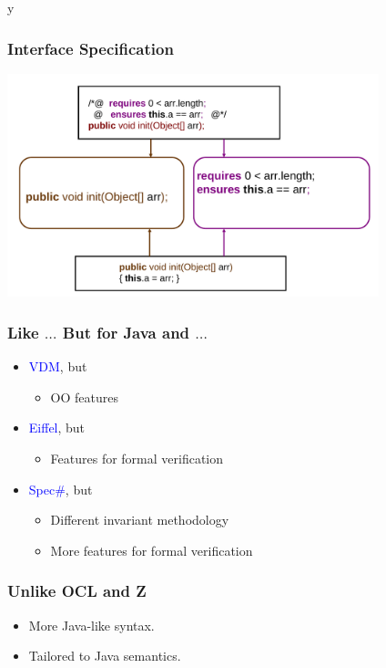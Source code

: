 \if y\MAKEHANDOUTS \documentclass[compress,landscape,handout]{beamer}
\begin{document}
\begin{frame}
\frametitle{Interface Specification}
\includegraphics[width=4.25in]{if1}
\end{frame}

\begin{frame}
\frametitle{Like $\ldots$ But for Java and $\ldots$}
\begin{itemize}
\item
\textcolor{blue}{VDM}, but
\begin{itemize}
\item
OO features
\end{itemize}

\item
\textcolor{blue}{Eiffel}, but
\begin{itemize}
\item
Features for formal verification
\end{itemize}

\item
\textcolor{blue}{Spec\#}, but
\begin{itemize}
\item
Different invariant methodology
\item
More features for formal verification
\end{itemize}
\end{itemize}
\end{frame}

\begin{frame}
\frametitle{Unlike OCL and Z}

\begin{itemize}
\item
More Java-like syntax.

\item
Tailored to Java semantics.
\end{itemize}
\end{frame}
\end{document}
